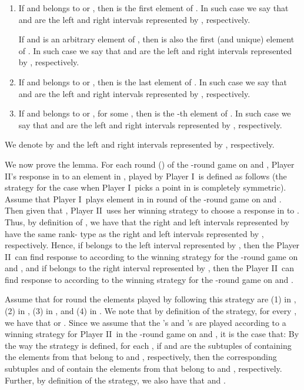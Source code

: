 \documentclass{LMCS}
\newcommand{\dupl}{Player II}
\newcommand{\spoiler}{Player I}
\theoremstyle{plain}
\theoremstyle{definition}
\begin{document}
\begin{enumerate}[]

\item If  and  belongs to  or
, then  is the first element of
. In such case we say that  and
 are the left and right intervals represented by
, respectively. 

If  and  is an arbitrary
element of , then  is also the first (and unique) element of
. In such case we say that  and
 are the left and right intervals represented by ,
respectively.

\item 
If  and  belongs to  or , then
 is the last element of . 
In such case we say that
 and  are the left and right intervals 
represented by , 
respectively.  

\item 
If  and  belongs to  or
, for some , then
 is the -th element of . 
In such case we say that
 and 
 are the left and right intervals represented by , 
respectively.  

\end{enumerate} We denote by  and  the left and right
intervals represented by , respectively.

We now prove the lemma.  For each round  () of the
-round game on  and ,
\dupl's response  in  to an element  in , played
by \spoiler\, is defined as follows (the strategy for the case when
\spoiler\ picks a point in  is completely symmetric). Assume
that \spoiler\ plays element  in  in round
 of the -round game on  and
. Then given that , \dupl\ uses her winning strategy to choose a
response  in  to . Thus, by
definition of , we have that the right and left intervals
represented by  have the same rank- type as the right and
left intervals represented by , respectively. Hence, if 
belongs to the left interval represented by , then the \dupl\
can find response  to  according to the winning strategy for
the -round game on  and , and if  belongs to
the right interval represented by , then the \dupl\ can find
response  to  according to the winning strategy for the
-round game on  and .

Assume that for round  the elements played by following
this strategy are (1)  in , (2)
 in , (3)  in
, and (4)  in . We note that by
definition of the strategy, for every , we have that  or . Since we assume that the 's and
's are played according to a winning strategy for \dupl\ in the
-round game on  and , it
is the case that:  By the way the
strategy is defined, for each , if  and
 are the subtuples of  containing the
elements from  that belong to  and
, respectively, then the corresponding subtuples  and  of  contain the elements
from  that belong to  and ,
respectively. Further, by definition of the strategy, we also have
that  and .
\end{document}
